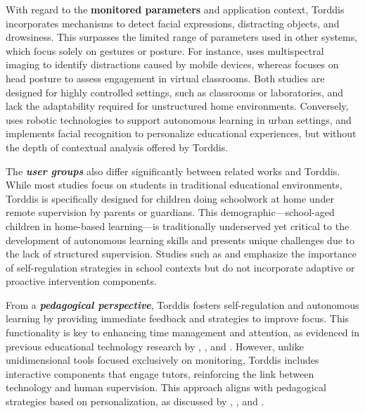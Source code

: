                 With regard to the \textbf{monitored parameters} and application context, Torddis incorporates mechanisms to detect facial expressions, distracting objects, and drowsiness. This surpasses the limited range of parameters used in other systems, which focus solely on gestures or posture. For instance, \cite{Campbell2015Using} uses multispectral imaging to identify distractions caused by mobile devices, whereas \cite{Ucar2022Recognizing} focuses on head posture to assess engagement in virtual classrooms. Both studies are designed for highly controlled settings, such as classrooms or laboratories, and lack the adaptability required for unstructured home environments. Conversely, \cite{DaCosta2023} uses robotic technologies to support autonomous learning in urban settings, and \cite{Boumiza2017} implements facial recognition to personalize educational experiences, but without the depth of contextual analysis offered by Torddis.
                
                The \textbf{\textit{user groups}} also differ significantly between related works and Torddis. While most studies focus on students in traditional educational environments, Torddis is specifically designed for children doing schoolwork at home under remote supervision by parents or guardians. This demographic—school-aged children in home-based learning—is traditionally underserved yet critical to the development of autonomous learning skills and presents unique challenges due to the lack of structured supervision. Studies such as \cite{Roberts2020Task} and \cite{Muljana2022Instructional} emphasize the importance of self-regulation strategies in school contexts but do not incorporate adaptive or proactive intervention components.
                
                From a \textbf{\textit{pedagogical perspective}}, Torddis fosters self-regulation and autonomous learning by providing immediate feedback and strategies to improve focus. This functionality is key to enhancing time management and attention, as evidenced in previous educational technology research by \cite{Palmer2022impact}, \cite{Roberts2020Task}, and \cite{Wang2022Empowering}. However, unlike unidimensional tools focused exclusively on monitoring, Torddis includes interactive components that engage tutors, reinforcing the link between technology and human supervision. This approach aligns with pedagogical strategies based on personalization, as discussed by \cite{Salter2014Exploring}, \cite{Bembich2016Future}, and \cite{Adcroft2018Developing}.
                
